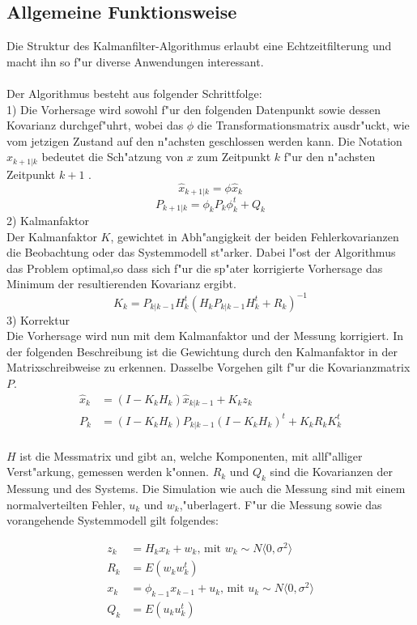 \begin{refsection}
\subsection{Allgemeine Funktionsweise}

Die Struktur des Kalmanfilter-Algorithmus erlaubt eine Echtzeitfilterung und macht ihn so f"ur diverse Anwendungen interessant.\\
\\
Der Algorithmus besteht aus folgender Schrittfolge:\\
1) Die Vorhersage wird sowohl f"ur den folgenden Datenpunkt sowie dessen Kovarianz durchgef"uhrt, wobei das \(\phi\) die Transformationsmatrix ausdr"uckt, wie vom jetzigen Zustand auf den n"achsten geschlossen werden kann. Die Notation \(\hat{x}_{k+1|k}\) bedeutet die Sch"atzung von \(x\) zum Zeitpunkt \(k\) f"ur den n"achsten Zeitpunkt \(k+1\) .\\
\[\hat{x}_{k+1|k} = \phi\hat{x}_{k}\]
\[P_{k+1|k}=\phi_{k}P_{k}\phi_{k}^{t}+Q_{k}\]
2) Kalmanfaktor\\
Der Kalmanfaktor \(K\), gewichtet in Abh"angigkeit der beiden Fehlerkovarianzen die Beobachtung oder das Systemmodell st"arker. Dabei l"ost der Algorithmus das Problem optimal,so dass sich f"ur die sp"ater korrigierte Vorhersage das Minimum der resultierenden Kovarianz ergibt.\\
\[K_{k}=P_{k|k-1}H^{t}_{k}(H_{k}P_{k|k-1}H^{t}_{k}+R_{k})^{-1}   \]
3) Korrektur\\
Die Vorhersage wird nun mit dem Kalmanfaktor und der Messung korrigiert. In der folgenden Beschreibung ist die Gewichtung durch den Kalmanfaktor in der Matrixschreibweise zu erkennen. Dasselbe Vorgehen gilt f"ur die Kovarianzmatrix $P$.\\
\begin{align*}
\hat{x}_{k}&=(I-K_{k}H_{k})\hat{x}_{k|k-1}+K_{k}z_{k}\\
P_{k}&=(I-K_{k}H_{k})P_{k|k-1}(I-K_{k}H_{k})^{t}+K_{k}R_{k}K^{t}_{k}  \end{align*}
\\
\(H\) ist die Messmatrix und gibt an, welche Komponenten, mit allf"alliger Verst"arkung, gemessen werden k"onnen. \(R_{k}\) und \(Q_{k}\) sind die Kovarianzen der Messung und des Systems. Die Simulation wie auch die Messung sind mit einem normalverteilten Fehler, \(u_{k} \text{ und } w_{k}\),"uberlagert. F"ur die Messung sowie das vorangehende Systemmodell gilt folgendes:

\begin{align*}
z_{k}&=H_{k}x_{k}+w_{k} \text{, mit } w_{k}\sim N\langle0,\sigma^{2}\rangle\\
R_{k}&=E(w_{k}w^{t}_{k})\\
x_{k}&=\phi_{k-1}x_{k-1}+u_{k} \text{, mit } u_{k}\sim N\langle0,\sigma^{2}\rangle\\ 
Q_{k}&=E(u_{k}u^{t}_{k})
\end{align*}


\end{refsection}
